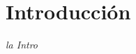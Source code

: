  \newcommand{\NoBiblioIntro}[1]{
 \ifthenelse{\equal{#1}{verdadero}}{}{}
 \NoBiblioIntro{verdadero}}


 \FormatoCapituloUnaLinea

 \chapter{Introducción}\label{chap:Introduccion}

 \thispagestyle{empty}
	
 \noindent\textit{la Intro}

 
 \vfill
 \minitoc
 \newpage

